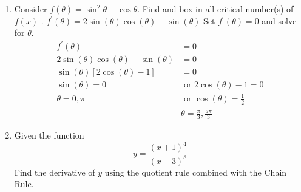 \documentclass{exam}
\begin{document}
\begin{enumerate}

\item Consider $f(\theta)=\sin^{2}{\theta}+\cos{\theta}$. Find and box in all critical number(s) of $f(x)$ .
   $f^{\prime}(\theta)=2\sin{(\theta)}\cos{(\theta)}-\sin{(\theta)}$
   Set $f^{\prime}(\theta)=0$ and solve for $\theta$.
\begin{align*}
                           f^{\prime}(\theta)& = 0\\
2\sin{(\theta)}\cos{(\theta)}-\sin{(\theta)} & = 0\\
\sin{(\theta)}[2\cos{(\theta)}-1] & = 0\\
                 \sin{(\theta)}=0 & \text{ or } 2\cos{(\theta)}-1=0 \\
             \boxed{\theta= 0, \pi} & \text{ or } \cos{(\theta)}=\frac{1}{2} \\
                                & \boxed{\theta= \frac{\pi}{3}, \frac{5\pi}{3}}
\end{align*}

\newpage
\item Given the function \[y=\frac{(x+1)^{4}}{(x-3)^{8}}\]
Find the derivative of $y$ using the quotient rule combined with the Chain Rule.
\vfill


\end{enumerate}
\end{document}
